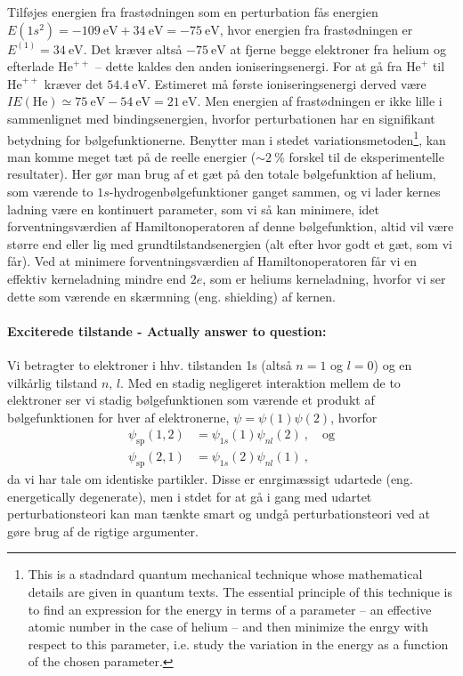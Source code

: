 Tilføjes energien fra frastødningen som en perturbation fås energien $E(1s^2) =  \SI{-109}{\eV} + \SI{34}{\eV} = \SI{-75}{\eV}$, hvor energien fra frastødningen er $E^{(1)} = \SI{34}{\eV}$. Det kræver altså $\SI{-75}{\eV}$ at fjerne begge elektroner fra helium og efterlade $\text{He}^{++}$ -- dette kaldes den \textsf{anden ioniseringsenergi}. For at gå fra $\text{He}^{+}$ til $\text{He}^{++}$ kræver det $\SI{54.4}{\eV}$. Estimeret må \textsf{første ioniseringsenergi} derved være $IE(\text{He}) \simeq \SI{75}{\eV} - \SI{54}{\eV} = \SI{21}{\eV}$. Men energien af frastødningen er ikke lille i sammenlignet med bindingsenergien, hvorfor perturbationen har en signifikant betydning for bølgefunktionerne. Benytter man i stedet variationsmetoden\footnote{This is a stadndard quantum mechanical technique whose mathematical details are given in quantum texts. The essential principle of this technique is to find an expression for the energy in terms of a parameter -- an effective atomic number in the case of helium -- and then minimize the enrgy with respect to this parameter, i.e. study the variation in the energy as a function of the chosen parameter.}, kan man komme meget tæt på de reelle energier ($\sim\SI{2}{\percent}$ forskel til de eksperimentelle resultater). Her gør man brug af et gæt på den totale bølgefunktion af helium, som værende to $1s$-hydrogenbølgefunktioner ganget sammen, og vi lader kernes ladning være en kontinuert parameter, som vi så kan minimere, idet forventningsværdien af Hamiltonoperatoren af denne bølgefunktion, altid vil være større end eller lig med grundtilstandsenergien (alt efter hvor godt et gæt, som vi får). Ved at minimere forventningsværdien af Hamiltonoperatoren får vi en effektiv kerneladning mindre end $2e$, som er heliums kerneladning, hvorfor vi ser dette som værende en skærmning (eng. shielding) af kernen.\\



\paragraph{Exciterede tilstande - Actually answer to question:} Vi betragter to elektroner i hhv. tilstanden 1s (altså $n=1$ og $l=0$) og en vilkårlig tilstand $n,\,l$. Med en stadig negligeret interaktion mellem de to elektroner ser vi stadig bølgefunktionen som værende et produkt af bølgefunktionen for hver af elektronerne, $\psi = \psi(1)\psi(2)$, hvorfor
\begin{align}
    \psi_\text{sp}(1,2) &= \psi_{1s}(1)\psi_{nl}(2) \: , \quad \text{og} \\
    \psi_\text{sp}(2,1) &= \psi_{1s}(2)\psi_{nl}(1) \: ,
\end{align}
da vi har tale om identiske partikler. Disse er enrgimæssigt udartede (eng. energetically degenerate), men i stdet for at gå i gang med udartet perturbationsteori kan man tænkte smart og undgå perturbationsteori ved at gøre brug af de rigtige argumenter.

